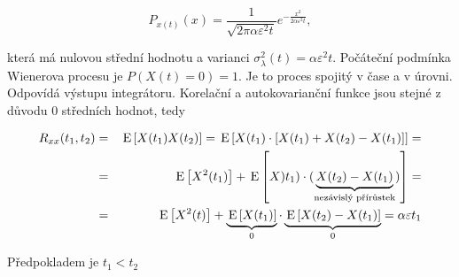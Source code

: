 \[ P_{x(t)}(x)=\frac{1}{\sqrt{2\pi\alpha\varepsilon^2 t}}e^{-\frac{x^2}{2\alpha\varepsilon^2 t}}, \]

která má nulovou střední hodnotu a varianci $\sigma^2_\lambda(t) = \alpha\varepsilon^2 t$. Počáteční podmínka Wienerova procesu je $P(X(t)=0)=1$. Je to proces spojitý v čase a v úrovni. Odpovídá výstupu integrátoru. Korelační a autokovarianční funkce jsou stejné z důvodu 0 středních hodnot, tedy

\begin{eqnarray*}
R_{xx}(t_1,t_2) &=&\,\mathrm{E}\left[X(t_1)X(t_2)\right] = \,\mathrm{E}\left[X(t_1)\cdot[X(t_1)+X(t_2)-X(t_1)]\right] = \\
& = & \,\mathrm{E}\left[X^2(t_1)\right] + \,\mathrm{E}\left[X)t_1)\cdot(\underbrace{X(t_2)-X(t_1)}_{\text{nezávislý přírůstek}})\right]= \\
& = & \,\mathrm{E}\left[X^2(t)\right]+\underbrace{\,\mathrm{E}\left[X(t_1)\right]}_0\cdot \underbrace{\,\mathrm{E}\left[X(t_2)-X(t_1)\right]}_0 = \alpha\varepsilon t_1
\end{eqnarray*}

Předpokladem je $t_1<t_2$